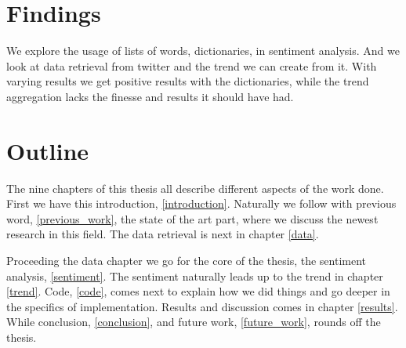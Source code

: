 \section{Findings}
We explore the usage of lists of words, dictionaries, in sentiment analysis.
And we look at data retrieval from twitter and the trend we can create from it. 
With varying results we get positive results with the dictionaries, while the
trend aggregation lacks the finesse and results it should have had. 

\section{Outline}
The nine chapters of this thesis all describe different aspects of the work
done. First we have this introduction, \ref{introduction}. Naturally we follow
with previous word, \ref{previous_work}, the state of the art part, where we
discuss the newest research in this field. The data retrieval is next in
chapter \ref{data}. 

Proceeding the data chapter we go for the core of the thesis, the sentiment
analysis, \ref{sentiment}. The sentiment naturally leads up to the trend in
chapter \ref{trend}. Code, \ref{code}, comes next to explain how we did things
and go deeper in the specifics of implementation. Results and discussion comes
in chapter \ref{results}. While conclusion, \ref{conclusion}, and future work,
\ref{future_work}, rounds off the thesis.
%
